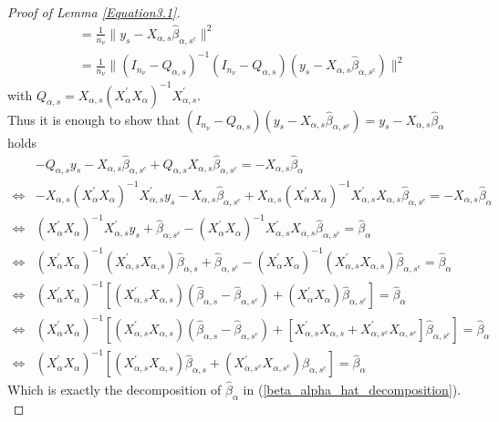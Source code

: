 \documentclass[Research_Module_ES.tex]{subfiles}
\begin{document}
\begin{proof}[Proof of Lemma \ref{Equation3.1}]
\begin{align*}
	&=\frac{1}{n_\nu}\parallel y_s-X_{\alpha,s}\hat{\beta}_{\alpha,s^c}\parallel^2\\
	&=\frac{1}{n_\nu}\parallel (I_{n_\nu}-Q_{\alpha,s})^{-1}(I_{n_\nu}-Q_{\alpha,s})(y_s-X_{\alpha,s}\hat{\beta}_{\alpha,s^c})\parallel^2
	\end{align*}
	with $Q_{\alpha,s}=X_{\alpha,s}(X_\alpha^\prime X_\alpha)^{-1}X_{\alpha,s}^\prime$.\\ 
	Thus it is enough to show that $(I_{n_\nu}-Q_{\alpha,s})(y_s-X_{\alpha,s}\hat{\beta}_{\alpha,s^c})=y_s-X_{\alpha,s}\hat{\beta}_\alpha$ holds 
	\begin{align*}
	&-Q_{\alpha,s}y_s-X_{\alpha,s}\hat{\beta}_{\alpha,s^c}+Q_{\alpha,s}X_{\alpha,s}\hat{\beta}_{\alpha,s^c}=-X_{\alpha,s}\hat{\beta}_\alpha\\
	\Leftrightarrow&-X_{\alpha,s}(X_{\alpha}^\prime X_{\alpha})^{-1}X_{\alpha,s}^\prime y_s- X_{\alpha,s}\hat{\beta}_{\alpha,s^c}+X_{\alpha,s}(X_{\alpha}^\prime X_{\alpha})^{-1}X_{\alpha,s}^\prime X_{\alpha,s}\hat{\beta}_{\alpha,s^c}=-X_{\alpha,s}\hat{\beta}_{\alpha}\\
	\Leftrightarrow&(X_{\alpha}^\prime X_{\alpha})^{-1}X_{\alpha,s}^\prime y_s+ \hat{\beta}_{\alpha,s^c}-(X_{\alpha}^\prime X_{\alpha})^{-1}X_{\alpha,s}^\prime X_{\alpha,s}\hat{\beta}_{\alpha,s^c}=\hat{\beta}_{\alpha}\\
	\Leftrightarrow&(X_{\alpha}^\prime X_{\alpha})^{-1}(X_{\alpha,s}^\prime X_{\alpha,s})\hat{\beta}_{\alpha,s}+ \hat{\beta}_{\alpha,s^c}-(X_{\alpha}^\prime X_{\alpha})^{-1}(X_{\alpha,s}^\prime X_{\alpha,s})\hat{\beta}_{\alpha,s^c}=\hat{\beta}_{\alpha}\\
	\Leftrightarrow&(X_{\alpha}^\prime X_{\alpha})^{-1}[(X_{\alpha,s}^\prime X_{\alpha,s})(\hat{\beta}_{\alpha,s}-\hat{\beta}_{\alpha,s^c})+(X_{\alpha}^\prime X_{\alpha})\hat{\beta}_{\alpha,s^c}]=\hat{\beta}_{\alpha}\\
	\Leftrightarrow&(X_{\alpha}^\prime X_{\alpha})^{-1}[(X_{\alpha,s}^\prime X_{\alpha,s})(\hat{\beta}_{\alpha,s}-\hat{\beta}_{\alpha,s^c})+[X_{\alpha,s}^\prime X_{\alpha,s}+X_{\alpha,s^c}^\prime X_{\alpha,s^c}]\hat{\beta}_{\alpha,s^c}]=\hat{\beta}_{\alpha}\\
	\Leftrightarrow&(X_\alpha^\prime X_\alpha)^{-1}[(X_{\alpha,s}^\prime X_{\alpha,s}) \hat{\beta}_{\alpha,s}+(X_{\alpha,s^c}^\prime X_{\alpha,s^c})\hat{\beta}_{\alpha,s^c}]=\hat{\beta}_{\alpha}
	\end{align*}
	Which is exactly the decomposition of $\hat{\beta}_{\alpha}$ in   (\ref{beta_alpha_hat_decomposition}).\\
\end{proof}
\end{document}

